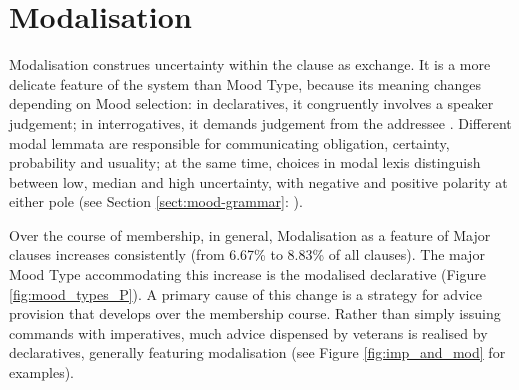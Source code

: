\section{Modalisation} \label{sect:modalisation}

Modalisation construes uncertainty within the clause as exchange. It is a more delicate feature of the  system than Mood Type, because its meaning changes depending on Mood selection: in declaratives, it congruently involves a speaker judgement; in interrogatives, it demands judgement from the addressee \cite{halliday_introduction_2004}. Different modal lemmata are responsible for communicating obligation, certainty, probability and usuality; at the same time, choices in modal lexis distinguish between low, median and high uncertainty, with negative and positive polarity at either pole (see Section \ref{sect:mood-grammar}: ).

%
Over the course of membership, in general, Modalisation as a feature of Major clauses increases consistently (from 6.67\% to 8.83\% of all clauses). The major Mood Type accommodating this increase is the modalised declarative (Figure \ref{fig:mood_types_P}). A primary cause of this change is a strategy for advice provision that develops over the membership course. Rather than simply issuing commands with imperatives, much advice dispensed by veterans is realised by declaratives, generally featuring modalisation (see Figure \ref{fig:imp_and_mod} for examples). 

